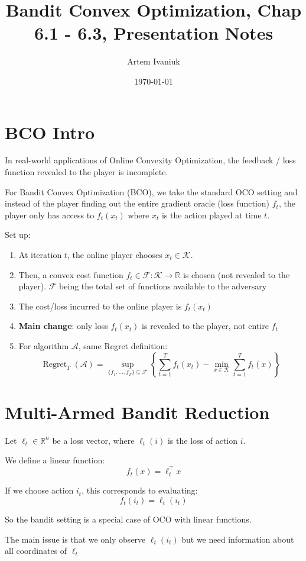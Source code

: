 \documentclass{article}
\title{Bandit Convex Optimization, Chap 6.1 - 6.3, Presentation Notes}
\author{Artem Ivaniuk}
\date{\today}
\begin{document}
\maketitle

\section{BCO Intro}
In real-world applications of Online Convexity Optimization, the feedback / loss function revealed to the player is incomplete.

For Bandit Convex Optimization (BCO), we take the standard OCO setting and instead of the player finding out the entire gradient oracle (loss function) $f_t$, the player only has access to $f_t(x_t)$ where $x_t$ is the action played at time $t$.

Set up:
\begin{enumerate}
\item At iteration $t$, the online player chooses $x_t \in \mathcal K$. 
\item Then, a convex cost function $f_t \in \mathcal{F}: \mathcal{K} \to \mathbb{R}$ is chosen (not revealed to the player). $\mathcal F$ being the total set of functions available to the adversary
\item The cost/loss incurred to the online player is $f_t(x_t)$ 
\item \textbf{Main change}: only loss $f_t(x_t)$ is revealed to the player, not entire $f_t$
\item For algorithm $\mathcal A$, same Regret definition:
\[\operatorname{Regret}_T(\mathcal A) = \operatorname{sup}_{\{f_1, \dots, f_T\}\subseteq \mathcal F} \left\{\sum_{t=1}^T f_t(x_t) - \min_{x \in \mathcal K} \sum_{t=1}^T f_t(x)\right\}\]
\end{enumerate}

\section{Multi-Armed Bandit Reduction}

Let $\ell_t \in \mathbb{R}^n$ be a loss vector, where $\ell_t(i)$ is the loss of action $i$.

We define a linear function:
\[
f_t(x) = \ell_t^\top x
\]

If we choose action $i_t$, this corresponds to evaluating:
\[
f_t(i_t) = \ell_t(i_t)
\]

So the bandit setting is a special case of OCO with linear functions.

The main issue is that we only observe $\ell_t(i_t)$ but we need information about all coordinates of $\ell_t$
\end{document}
